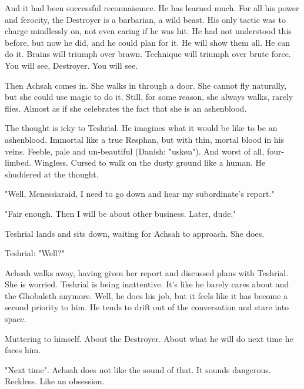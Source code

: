 And it had been successful reconnaisance. 
He has learned much. 
For all his power and ferocity, the Destroyer is a barbarian, a wild beast. 
His only tactic was to charge mindlessly on, not even caring if he was hit. 
He had not understood this before, but now he did, and he could plan for it. 
He will show them all. 
He can do it. 
Brains will triumph over brawn. 
Technique will triumph over brute force. 
You will see, Destroyer. 
You will see. 

Then Achsah comes in. 
She walks in through a door. 
She cannot fly naturally, but she could use magic to do it. 
Still, for some reason, she always walks, rarely flies. 
Almost as if she celebrates the fact that she is an ashenblood. 

The thought is icky to Teshrial. 
He imagines what it would be like to be an ashenblood.
Immortal like a true Resphan, but with thin, mortal blood in his veins. 
Feeble, pale and un-beautiful (Danish: "uskøn"). 
And worst of all, four-limbed. 
Wingless. 
Cursed to walk on the dusty ground like a human. 
He shuddered at the thought. 

"Well, Menessiaraid, I need to go down and hear my subordinate's report."

"Fair enough. Then I will be about other business. Later, dude."

Teshrial lands and sits down, waiting for Achsah to approach. 
She does. 

Teshrial: "Well?"









\begin{comment}
\subsection{Achsah}
\end{comment}
\new
Achsah walks away, having given her report and discussed plans with Teshrial. 
She is worried. 
Teshrial is being inattentive. 
It's like he barely cares about \Malcur and the Ghobaleth anymore. 
Well, he does his job, but it feels like it has become a second priority to him. 
He tends to drift out of the conversation and stare into space. 

Muttering to himself. 
About the Destroyer.
About what he will do next time he faces him. 

"Next time". 
Achsah does not like the sound of that. 
It sounds dangerous. 
Reckless.
Like an obsession. 

